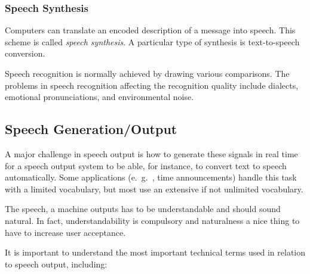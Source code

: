 
\subsubsection*{Speech Synthesis}
Computers can translate an encoded description of a message into speech. This scheme is called \textit{speech synthesis}. A particular type of synthesis is text-to-speech conversion.

Speech recognition is normally achieved by drawing various comparisons. The problems in speech recognition affecting the recognition quality
include dialects, emotional pronunciations, and environmental noise. 

\subsection[Generation]{Speech Generation/Output}

A major challenge in speech output is how to generate these signals in real time for a speech output system to be able, for instance, to convert text to speech automatically. Some applications (e.\ g.\ , time announcements) handle this task with a limited vocabulary, but most use an extensive if not unlimited vocabulary.

The speech, a machine outputs has to be understandable and should sound natural. In fact, understandability is compulsory and naturalness a nice thing to have to increase user acceptance.

It is important to understand the most important technical terms used in relation to speech output, including:

